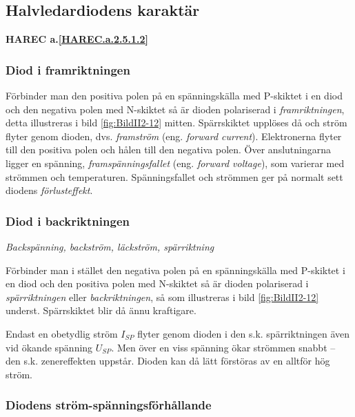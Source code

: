 \subsection{Halvledardiodens karaktär}
\textbf{HAREC a.\ref{HAREC.a.2.5.1.2}\label{myHAREC.a.2.5.1.2}}

\subsubsection{Diod i framriktningen}

Förbinder man den positiva polen på en spänningskälla med P-skiktet i en diod
och den negativa polen med N-skiktet så är dioden polariserad i
\emph{framriktningen}, detta illustreras i bild \ref{fig:BildII2-12} mitten.
Spärrskiktet upplöses då och ström flyter genom dioden, dvs. \emph{framström}
(eng. \emph{forward current}).
Elektronerna flyter till den positiva polen och hålen till den negativa polen.
Över anslutningarna ligger en spänning, \emph{framspänningsfallet}
(eng. \emph{forward voltage}), som varierar med strömmen och temperaturen.
Spänningsfallet och strömmen ger på normalt sett diodens \emph{förlusteffekt}.

\subsubsection{Diod i backriktningen}

\emph{Backspänning, backström, läckström, spärriktning}

Förbinder man i stället den negativa polen på en spänningskälla med P-skiktet i
en diod och den positiva polen med N-skiktet så är dioden polariserad i
\emph{spärriktningen} eller \emph{backriktningen}, så som illustreras i
bild \ref{fig:BildII2-12} underst.
Spärrskiktet blir då ännu kraftigare.

Endast en obetydlig ström \(I_{SP}\) flyter genom dioden i den s.k.
spärriktningen även vid ökande spänning \(U_{SP}\).
Men över en viss spänning ökar strömmen snabbt -- den s.k. zenereffekten
uppstår.
Dioden kan då lätt förstöras av en alltför hög ström.

\subsubsection{Diodens ström-spänningsförhållande}

